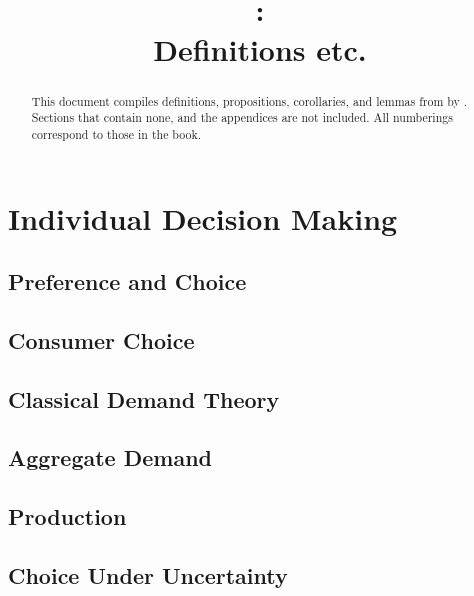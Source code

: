 \documentclass{report} %
\title{\citetitle{mas1995microeconomic}\\\parencite{mas1995microeconomic}:\\Definitions etc.}
\author{}
\date{}
\theoremstyle{definition}
\begin{document}
\maketitle

\renewcommand{\abstractname}{Preface}
\begin{abstract}
	This document compiles definitions, propositions, corollaries, and lemmas from  by \cite{mas1995microeconomic}.
	Sections that contain none, and the appendices are not included.
	All numberings correspond to those in the book.
	
\end{abstract}

\tableofcontents

\part{Individual Decision Making}

\chapter{Preference and Choice}


\chapter{Consumer Choice}


\chapter{Classical Demand Theory}


\chapter{Aggregate Demand}


\chapter{Production}


\chapter{Choice Under Uncertainty}

\end{document}
